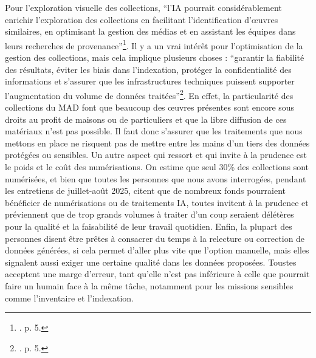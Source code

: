 Pour l'exploration visuelle des collections, \enquote{l'IA pourrait considérablement enrichir l'exploration des collections en facilitant l'identification d’œuvres similaires, en optimisant la gestion des médias et en assistant les équipes dans leurs recherches de provenance}\footnote{\cite{bermes_repenser_2025}. p. 5.}. Il y a un vrai intérêt pour l'optimisation de la gestion des collections, mais cela implique plusieurs choses : \enquote{garantir la fiabilité des résultats, éviter les biais dans l'indexation, protéger la confidentialité des informations et s'assurer que les infrastructures techniques puissent supporter l'augmentation du volume de données traitées}\footnote{\cite{bermes_repenser_2025}. p. 5.}. En effet, la particularité des collections du MAD font que beaucoup des œuvres présentes sont encore sous droits au profit de maisons ou de particuliers et que la libre diffusion de ces matériaux n'est pas possible. Il faut donc s'assurer que les traitements que nous mettons en place ne risquent pas de mettre entre les mains d'un tiers des données protégées ou sensibles. Un autre aspect qui ressort et qui invite à la prudence est le poids et le coût des numérisations. On estime que seul 30\% des collections sont numérisées, et bien que toutes les personnes que nous avons interrogées, pendant les entretiens de juillet-août 2025, citent que de nombreux fonds pourraient bénéficier de numérisations ou de traitements IA, toutes invitent à la prudence et préviennent que de trop grands volumes à traiter d'un coup seraient délétères pour la qualité et la faisabilité de leur travail quotidien. Enfin, la plupart des personnes disent être prêtes à consacrer du temps à la relecture ou correction de données générées, si cela permet d'aller plus vite que l'option manuelle, mais elles signalent aussi exiger une certaine qualité dans les données proposées. Tous\wokisme tes acceptent une marge d'erreur, tant qu'elle n'est pas inférieure à celle que pourrait faire un humain face à la même tâche, notamment pour les missions sensibles comme l'inventaire et l'indexation.

